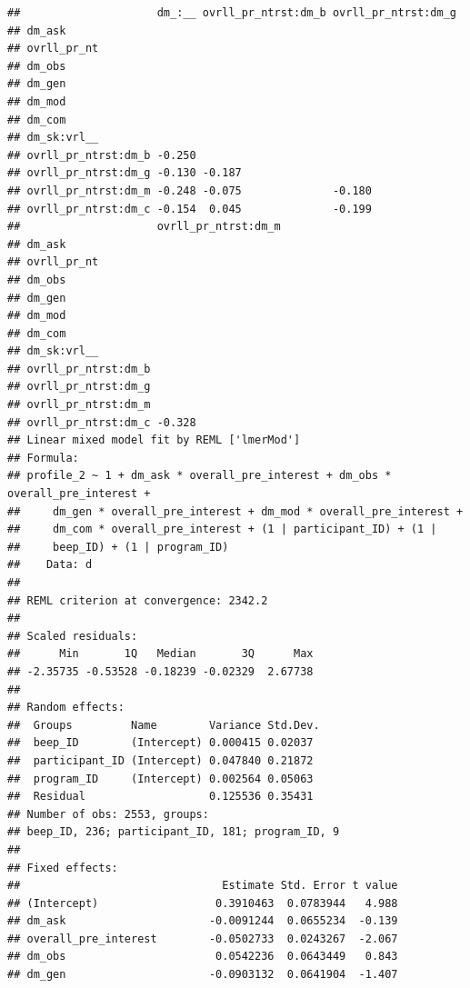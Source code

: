 \documentclass[]{msu-thesis}
\theoremstyle{definition}
\theoremstyle{definition}
\theoremstyle{definition}
\theoremstyle{remark}
\begin{document}
\begin{verbatim}
##                     dm_:__ ovrll_pr_ntrst:dm_b ovrll_pr_ntrst:dm_g
## dm_ask                                                            
## ovrll_pr_nt                                                       
## dm_obs                                                            
## dm_gen                                                            
## dm_mod                                                            
## dm_com                                                            
## dm_sk:vrl__                                                       
## ovrll_pr_ntrst:dm_b -0.250                                        
## ovrll_pr_ntrst:dm_g -0.130 -0.187                                 
## ovrll_pr_ntrst:dm_m -0.248 -0.075              -0.180             
## ovrll_pr_ntrst:dm_c -0.154  0.045              -0.199             
##                     ovrll_pr_ntrst:dm_m
## dm_ask                                 
## ovrll_pr_nt                            
## dm_obs                                 
## dm_gen                                 
## dm_mod                                 
## dm_com                                 
## dm_sk:vrl__                            
## ovrll_pr_ntrst:dm_b                    
## ovrll_pr_ntrst:dm_g                    
## ovrll_pr_ntrst:dm_m                    
## ovrll_pr_ntrst:dm_c -0.328             
## Linear mixed model fit by REML ['lmerMod']
## Formula: 
## profile_2 ~ 1 + dm_ask * overall_pre_interest + dm_obs * overall_pre_interest +  
##     dm_gen * overall_pre_interest + dm_mod * overall_pre_interest +  
##     dm_com * overall_pre_interest + (1 | participant_ID) + (1 |  
##     beep_ID) + (1 | program_ID)
##    Data: d
## 
## REML criterion at convergence: 2342.2
## 
## Scaled residuals: 
##      Min       1Q   Median       3Q      Max 
## -2.35735 -0.53528 -0.18239 -0.02329  2.67738 
## 
## Random effects:
##  Groups         Name        Variance Std.Dev.
##  beep_ID        (Intercept) 0.000415 0.02037 
##  participant_ID (Intercept) 0.047840 0.21872 
##  program_ID     (Intercept) 0.002564 0.05063 
##  Residual                   0.125536 0.35431 
## Number of obs: 2553, groups:  
## beep_ID, 236; participant_ID, 181; program_ID, 9
## 
## Fixed effects:
##                               Estimate Std. Error t value
## (Intercept)                  0.3910463  0.0783944   4.988
## dm_ask                      -0.0091244  0.0655234  -0.139
## overall_pre_interest        -0.0502733  0.0243267  -2.067
## dm_obs                       0.0542236  0.0643449   0.843
## dm_gen                      -0.0903132  0.0641904  -1.407

\end{verbatim}
\end{document}
